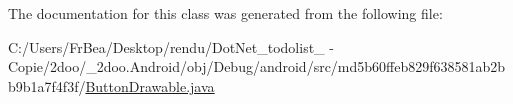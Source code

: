 The documentation for this class was generated from the following file:\begin{CompactItemize}
\item 
C:/Users/FrBea/Desktop/rendu/DotNet\_\-todolist\_ - Copie/2doo/\_\-2doo.Android/obj/Debug/android/src/md5b60ffeb829f638581ab2bb9b1a7f4f3f/\hyperlink{_button_drawable_8java}{ButtonDrawable.java}\end{CompactItemize}
